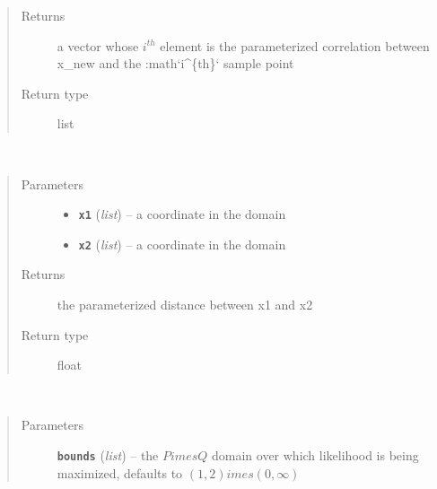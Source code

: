\documentclass[letterpaper,10pt,english]{sphinxmanual}
\begin{document}
\begin{fulllineitems}
\begin{fulllineitems}
\begin{quote}
\begin{description}
\item[{Returns}] \leavevmode
a vector whose \(i^{th}\) element is the parameterized correlation between x\_new and the :math{}`i\textasciicircum{}\{th\}{}` sample point

\item[{Return type}] \leavevmode
list

\end{description}\end{quote}

\end{fulllineitems}


\begin{fulllineitems}
\label{index:smbo.models.dace.dist}~\begin{quote}\begin{description}
\item[{Parameters}] \leavevmode\begin{itemize}
\item {} 
\textbf{\texttt{x1}} (\emph{list}) -- a coordinate in the domain

\item {} 
\textbf{\texttt{x2}} (\emph{list}) -- a coordinate in the domain

\end{itemize}

\item[{Returns}] \leavevmode
the parameterized distance between x1 and x2

\item[{Return type}] \leavevmode
float

\end{description}\end{quote}

\end{fulllineitems}


\begin{fulllineitems}
\label{index:smbo.models.dace.max_likelihood}~\begin{quote}\begin{description}
\item[{Parameters}] \leavevmode
\textbf{\texttt{bounds}} (\emph{list}) -- the \(P  imes Q\) domain over which likelihood is being maximized, defaults to \((1,2)       imes(0,\infty)\)


\end{description}
\end{quote}
\end{fulllineitems}
\end{fulllineitems}
\end{document}
